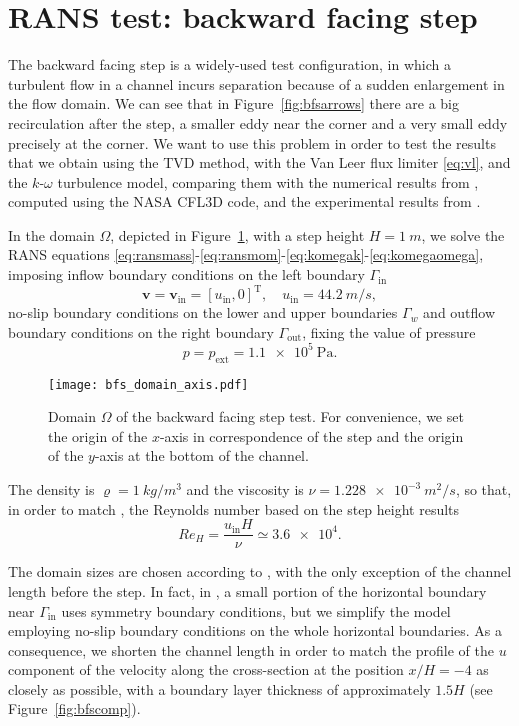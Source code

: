 \section{RANS test: backward facing step}
The backward facing step is a widely-used test configuration, in which a 
turbulent flow in a channel incurs separation because of a sudden enlargement 
in the flow domain. We can see that in Figure~\ref{fig:bfsarrows} there are a 
big recirculation after the step, a smaller eddy near the corner and a very 
small 
eddy precisely at the corner. We want to use this problem in order to test the 
results that we obtain using the TVD method, with the Van Leer flux limiter 
\eqref{eq:vl}, and the $k\text{-}\omega$ turbulence model, comparing them with 
the numerical results from \cite{web:nasa}, computed using the NASA CFL3D code, 
and the experimental results from \cite{bfs:driver}.

In the domain $\Omega$, depicted in Figure~\ref{fig:bfsdomain}, with a step height $H=\SI{1}{m}$, we solve the RANS equations \eqref{eq:ransmass}-\eqref{eq:ransmom}-\eqref{eq:komegak}-\eqref{eq:komegaomega}, imposing inflow boundary conditions on the left boundary $\Gamma_\text{in}$
\begin{equation}
	\mathbf{v} = \mathbf{v}_\text{in} = [u_\text{in}, 0]^\mathrm{T}, \quad u_\text{in} = \SI{44.2}{m/s},
\end{equation} no-slip boundary conditions on the lower and upper boundaries $\Gamma_w$ and outflow boundary conditions on the right boundary $\Gamma_\text{out}$, fixing the value of pressure
\begin{equation}
	p = p_\text{ext} = \SI{1.1e5}{\pascal}.
\end{equation}
\begin{figure}
	\centering
	\texttt{[image: bfs\_domain\_axis.pdf]}
	\caption[Domain of the backward facing step test]{Domain $\Omega$ of the backward facing step test. For convenience, we set the origin of the $x$-axis in correspondence of the step and the origin of the $y$-axis at the bottom of the channel.}
	\label{fig:bfsdomain}
\end{figure}
The density is $\varrho = \SI{1}{kg/m^3}$ and the viscosity is $\nu=\SI{1.228e-3}{m^2/s}$, so that, in order to match \cite{web:nasa}, the Reynolds number based on the step height results
\begin{equation}
	Re_H = \frac{u_\text{in}H}{\nu} \simeq \num{3.6e4}.
\end{equation}

The domain sizes are chosen according to \cite{web:nasa}, with the only 
exception of the channel length before the step. In fact, in \cite{web:nasa}, a 
small portion of the horizontal boundary near $\Gamma_\text{in}$ uses symmetry 
boundary conditions, but we simplify the model employing no-slip boundary 
conditions on the whole horizontal boundaries. As a consequence, we shorten the 
channel length in order to match the profile of the $u$ 
component of the velocity along the cross-section at the position $x/H=-4$ as closely as possible, 
with a boundary layer thickness of approximately $1.5H$ (see 
Figure~\ref{fig:bfscomp}).

